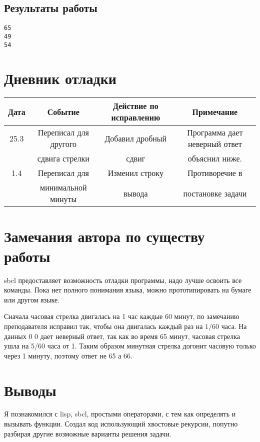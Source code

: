 \documentclass[15pt]{extarticle}
\begin{document}
\subsection{Результаты работы}

\begin{lstlisting}
65 
49 
54
\end{lstlisting}

\section{Дневник отладки}

\begin{tabular}{|c|c|c|c|}
\hline
Дата		&	Событие		&	Действие по исправлению	&	Примечание \\
\hline
25.3		& Переписал для другого  & Добавил дробный & Программа дает неверный ответ \\
		& сдвига стрелки		& сдвиг			&  объяснил ниже. \\
\hline
1.4		& Переписал для  & Изменил строку &  Противоречие в  \\
		& минимальной минуты	& вывода			&  постановке задачи \\
\hline
\end{tabular}

\section{Замечания автора по существу работы}
sbcl предоставляет возможность отладки программы, надо лучше освоить все команды. Пока нет полного понимания языка, можно прототипировать на бумаге или другом языке.

Сначала часовая стрелка двигалась на 1 час каждые 60 минут, по замечанию преподавателя исправил так, чтобы она двигалась каждый раз на $1/60$ часа. На данных 0 0 дает неверный ответ, так как во время 65 минут, часовая стрелка ушла на 5/60 часа от 1. Таким образом минутная стрелка догонит часовую только через 1 минуту, поэтому ответ не 65 а 66.

\section{Выводы}
Я познакомился с lisp, sbcl, простыми операторами, с тем как определять и вызывать функции. Создал код использующий хвостовые рекурсии, попутно разбирая другие возможные варианты решения задачи.
\end{document}
